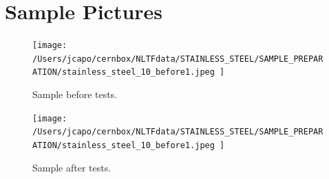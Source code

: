 \documentclass[12pt]{article}
\begin{document}
\section*{Sample Pictures}
\label{sec:pictures}

\begin{figure}[H]
    \centering
    \begin{minipage}{\textwidth}
        \centering
        \texttt{[image:  /Users/jcapo/cernbox/NLTFdata/STAINLESS\_STEEL/SAMPLE\_PREPARATION/stainless\_steel\_10\_before1.jpeg ]}
        \centering
        \caption{Sample before tests.}
        \label{fig:sample_before}
    \end{minipage}

    \vspace{0.02\textheight}

    \begin{minipage}{\textwidth}
        \centering
        \texttt{[image:  /Users/jcapo/cernbox/NLTFdata/STAINLESS\_STEEL/SAMPLE\_PREPARATION/stainless\_steel\_10\_before1.jpeg ]}
        \centering
        \caption{Sample after tests.}
        \label{fig:sample_after}
    \end{minipage}
\end{figure}
\end{document}
